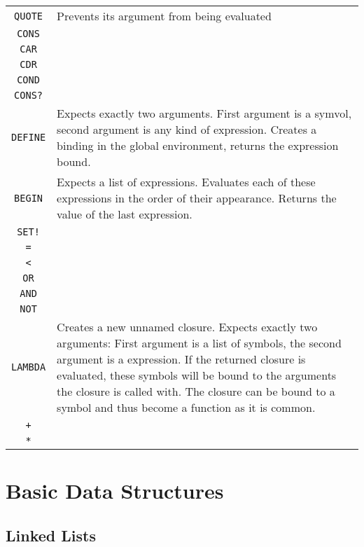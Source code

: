\documentclass[12pt]{article}
\begin{document}
\begin{table}[h]
    \centering
    \begin{tabular}{c|l}
        \texttt{QUOTE} & Prevents its argument from being evaluated \\
        \texttt{CONS} & \\
        \texttt{CAR} & \\
        \texttt{CDR} & \\
        \texttt{COND} & \\
        \texttt{CONS?} & \\
        \texttt{DEFINE} & Expects exactly two arguments. First argument is a
        symvol, second argument is any kind of expression. Creates a binding in
        the global environment, returns the expression bound.\\
        \texttt{BEGIN} & Expects a list of expressions. Evaluates each of these
        expressions in the order of their appearance. Returns the value of the last
        expression. \\
        \texttt{SET!} & \\
        \texttt{=} & \\
        \texttt{<} & \\
        \texttt{OR} & \\
        \texttt{AND} & \\
        \texttt{NOT} & \\
        \texttt{LAMBDA} & Creates a new unnamed closure. Expects exactly two
        arguments: First argument is a list of symbols, the second argument is a
        expression. If the returned closure is evaluated, these symbols will be
        bound to the arguments the closure is called with. The closure can be
        bound to a symbol and thus become a function as it is common.\\
        \texttt{+} & \\
        \texttt{*} & 
    \end{tabular}
    \caption{\label{tbl:CoreFunctions}}
\end{table}


\section{Basic Data Structures}

\subsection{Linked Lists}
\end{document}
